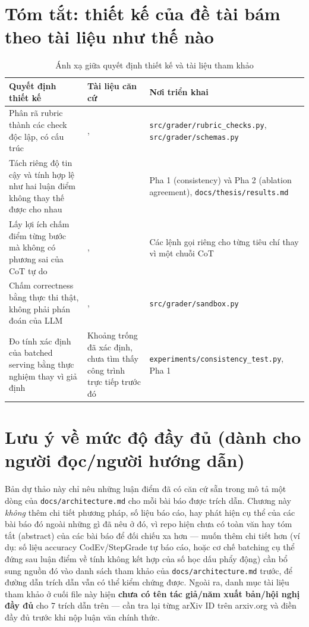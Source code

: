 \documentclass[a4paper,12pt]{report}
\begin{document}
\section{Tóm tắt: thiết kế của đề tài bám theo tài liệu như thế nào}

\begin{table}[h]
\centering
\begin{tabular}{p{4cm}p{4cm}p{5cm}}
\toprule
\textbf{Quyết định thiết kế} & \textbf{Tài liệu căn cứ} & \textbf{Nơi triển khai} \\
\midrule
Phân rã rubric thành các check độc lập, có cấu trúc &
  \cite{survey_llm_judge}, \cite{rubric_decomposition} &
  \texttt{src/grader/rubric\_checks.py}, \texttt{src/grader/schemas.py} \\
Tách riêng độ tin cậy và tính hợp lệ như hai luận điểm không thay thế
  được cho nhau &
  \cite{reliability_without_validity} &
  Pha 1 (consistency) và Pha 2 (ablation agreement),
  \texttt{docs/thesis/results.md} \\
Lấy lợi ích chấm điểm từng bước mà không có phương sai của CoT tự do &
  \cite{codev}, \cite{stepgrade} &
  Các lệnh gọi riêng cho từng tiêu chí thay vì một chuỗi CoT \\
Chấm correctness bằng thực thi thật, không phải phán đoán của LLM &
  \cite{autograding_test_suites}, \cite{multi_lang_sandbox} &
  \texttt{src/grader/sandbox.py} \\
Đo tính xác định của batched serving bằng thực nghiệm thay vì giả định &
  Khoảng trống đã xác định, chưa tìm thấy công trình trực tiếp trước đó &
  \texttt{experiments/consistency\_test.py}, Pha 1 \\
\bottomrule
\end{tabular}
\caption{Ánh xạ giữa quyết định thiết kế và tài liệu tham khảo}
\end{table}

\section{Lưu ý về mức độ đầy đủ (dành cho người đọc/người hướng dẫn)}

Bản dự thảo này chỉ nêu những luận điểm đã có căn cứ sẵn trong mô tả một
dòng của \texttt{docs/architecture.md} cho mỗi bài báo được trích dẫn.
Chương này \emph{không} thêm chi tiết phương pháp, số liệu báo cáo, hay
phát hiện cụ thể của các bài báo đó ngoài những gì đã nêu ở đó, vì repo
hiện chưa có toàn văn hay tóm tắt (abstract) của các bài báo để đối chiếu
xa hơn — muốn thêm chi tiết hơn (ví dụ: số liệu accuracy CodEv/StepGrade tự
báo cáo, hoặc cơ chế batching cụ thể đứng sau luận điểm về tính không kết
hợp của số học dấu phẩy động) cần bổ sung nguồn đó vào danh sách tham khảo
của \texttt{docs/architecture.md} trước, để đường dẫn trích dẫn vẫn có thể
kiểm chứng được. Ngoài ra, danh mục tài liệu tham khảo ở cuối file này hiện
\textbf{chưa có tên tác giả/năm xuất bản/hội nghị đầy đủ} cho 7 trích dẫn
trên — cần tra lại từng arXiv ID trên arxiv.org và điền đầy đủ trước khi
nộp luận văn chính thức.
\end{document}
